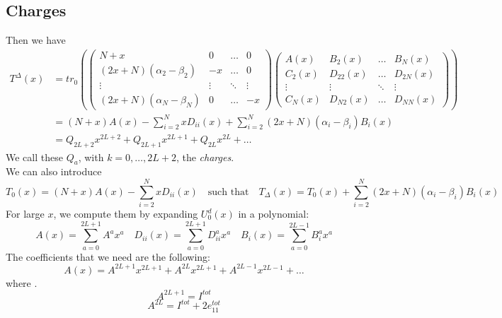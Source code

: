 \documentclass[11pt]{article}
\numberwithin{equation}{section}
\numberwithin{equation}{subsection}
\begin{document}
\subsection{Charges}
Then we have
\begin{equation}
	\begin{split}
	T^{\Delta}(x)&=tr_{0}\left(\begin{pmatrix}
		N+x&0&\ldots&0\\
		(2x+N)(\alpha_{2}-\beta_{2})&-x&\ldots&0\\
		\vdots&\vdots&\ddots&\vdots\\
		(2x+N)(\alpha_{N}-\beta_{N})&0&\ldots&-x
	\end{pmatrix}\begin{pmatrix}
	A(x)&B_{2}(x)&\ldots&B_{N}(x)\\
	C_{2}(x)&D_{22}(x)&\ldots&D_{2N}(x)\\
	\vdots&\vdots&\ddots&\vdots\\
	C_{N}(x)&D_{N2}(x)&\ldots&D_{NN}(x)
\end{pmatrix}\right)\\&=
(N+x)A(x)-\sum_{i=2}^{N}xD_{ii}(x)+\sum_{i=2}^{N}(2x+N)(\alpha_{i}-\beta_{i})B_{i}(x)\\&=
Q_{2L+2}x^{2L+2}+Q_{2L+1}x^{2L+1}+Q_{2L}x^{2L}+\ldots
\end{split}
\end{equation}
We call these $Q_{a}$, with $k=0,\ldots,2L+2$, the \textit{charges}. \\
We can also introduce 
\begin{equation}
	T_{0}(x)=(N+x)A(x)-\sum_{i=2}^{N}xD_{ii}(x)\quad\text{such that}\quad T_{\Delta}(x)=T_{0}(x)+\sum_{i=2}^{N}(2x+N)(\alpha_{i}-\beta_{i})B_{i}(x)
\end{equation}For large $x$, we compute them by expanding $U_{0}^{d}(x)$ in a polynomial: 
\begin{equation}
	A(x)=\sum_{a=0}^{2L+1}A^{a}x^{a}\quad D_{ii}(x)=\sum_{a=0}^{2L+1}D_{ii}^{a}x^{a}\quad B_{i}(x)=\sum_{a=0}^{2L-1}B_{i}^{a}x^{a}
\end{equation}
The coefficients that we need are the following:
\begin{equation}
	A(x)=A^{2L+1}x^{2L+1}+A^{2L}x^{2L+1}+A^{2L-1}x^{2L-1}+\ldots
\end{equation}
where .
\begin{equation}
	A^{2L+1}=I^{tot}
\end{equation}
\begin{equation}
	A^{2L}=I^{tot}+2e_{11}^{tot}
\end{equation}
\end{document}
